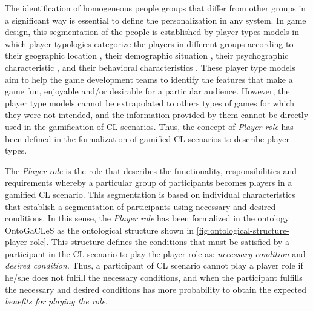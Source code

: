 The identification of homogeneous people groups that differ from other groups in a significant way is essential to define the personalization in any system. In game design, this segmentation of the people is established by player types models in which player typologies categorize the players in different groups according to their geographic location \cite{BenJuddChrisAvelloneHideoKojimaKeijiInafune2016, ChakrabortyNorcioVeerAndreMillerRegelsberger2015}, their demographic situation \cite{GreenbergSherryLachlanLucasHolmstrom2010, Shaw2012}, their psychographic characteristic \cite{Tseng2011, Yee2006}, and their behavioral characteristics \cite{Bartle2004, Lazzaro2009}. These player type models aim to help the game development teams to identify the features that make a game fun, enjoyable and/or desirable for a particular audience. However, the player type models cannot be extrapolated to others types of games for which they were not intended, and the information provided by them cannot be directly used in the gamification of CL scenarios. Thus, the concept of \emph{Player role} has been defined in the formalization of gamified CL scenarios to describe player types.

The \emph{Player role} is the role that describes the functionality, responsibilities and requirements whereby a particular group of participants becomes players in a gamified CL scenario. This segmentation is based on individual characteristics that establish a segmentation of participants using necessary and desired conditions. In this sense, the \emph{Player role} has been formalized in the ontology OntoGaCLeS as the ontological structure shown in \autoref{fig:ontological-structure-player-role}. This structure defines the conditions that must be satisfied by a participant in the CL scenario to play the player role as: \emph{necessary condition} and \emph{desired condition}. Thus, a participant of CL scenario cannot play a player role if he/she does not fulfill the necessary conditions, and when the participant fulfills the necessary and desired conditions has more probability to obtain the expected \emph{benefits for playing the role}.

